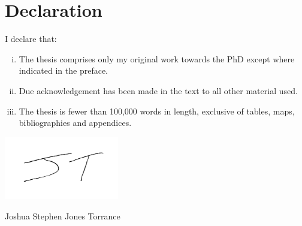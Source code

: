 \chapter*{Declaration}
I declare that:\\
\begin{enumerate}[i.]
\item The thesis comprises only my original work towards the PhD except where indicated in the preface.\\
\item Due acknowledgement has been made in the text to all other material used.\\
\item The thesis is fewer than 100,000 words in length, exclusive of tables, maps, bibliographies and appendices.\par
\end{enumerate}
\vspace{0.5cm}
{\hspace*{-0.2cm}\noindent\includegraphics[width=5cm]{0frontmatter/signature.png}}
\par
\vspace{-0.2cm}
\noindent Joshua Stephen Jones Torrance